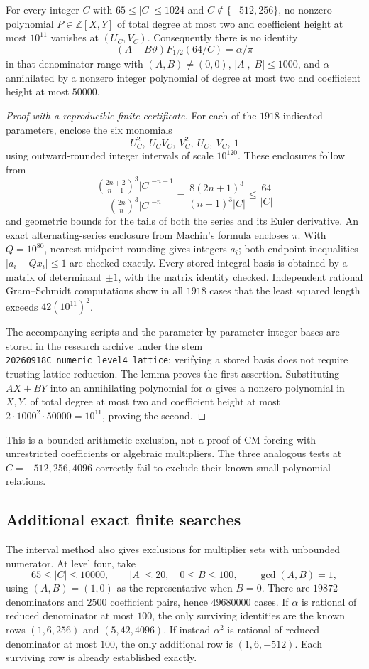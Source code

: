 \begin{proposition}
For every integer $C$ with $65\le|C|\le1024$ and
$C\notin\{-512,256\}$, no nonzero polynomial
$P\in\mathbb Z[X,Y]$ of total degree at most two and coefficient height
at most $10^{11}$ vanishes at $(U_C,V_C)$.
Consequently there is no identity
\[
 (A+B\vartheta)F_{1/2}(64/C)=\alpha/\pi
\]
in that denominator range with $(A,B)\ne(0,0)$,
$|A|,|B|\le1000$, and $\alpha$ annihilated by a nonzero integer
polynomial of degree at most two and coefficient height at most $50000$.
\end{proposition}
\begin{proof}[Proof with a reproducible finite certificate]
For each of the $1918$ indicated parameters, enclose the six monomials
\[
 U_C^2,\ U_CV_C,\ V_C^2,\ U_C,\ V_C,\ 1
\]
using outward-rounded integer intervals of scale $10^{120}$. These
enclosures follow from
\[
 \frac{\binom{2n+2}{n+1}^3|C|^{-n-1}}
      {\binom{2n}{n}^3|C|^{-n}}
 =\frac{8(2n+1)^3}{(n+1)^3|C|}\le\frac{64}{|C|}
\]
and geometric bounds for the tails of both the series and its Euler
derivative. An exact alternating-series enclosure from Machin's formula
encloses $\pi$. With $Q=10^{80}$, nearest-midpoint rounding gives
integers $a_i$; both endpoint inequalities $|a_i-Qx_i|\le1$ are checked
exactly. Every stored integral basis is obtained by a matrix of determinant
$\pm1$, with the matrix identity checked. Independent rational
Gram--Schmidt computations show in all $1918$ cases that the least squared
length exceeds $42(10^{11})^2$.

The accompanying scripts and the parameter-by-parameter integer bases are
stored in the research archive under the stem
\texttt{20260918C\_numeric\_level4\_lattice}; verifying a stored basis
does not require trusting lattice reduction. The lemma proves the first
assertion. Substituting $AX+BY$ into an annihilating polynomial for
$\alpha$ gives a nonzero polynomial in $X,Y$, of total degree at most two
and coefficient height at most
$2\cdot1000^2\cdot50000=10^{11}$, proving the second.
\end{proof}

This is a bounded arithmetic exclusion, not a proof of CM forcing with
unrestricted coefficients or algebraic multipliers. The three analogous
tests at $C=-512,256,4096$ correctly fail to exclude their known small
polynomial relations.

\subsection{Additional exact finite searches}
The interval method also gives exclusions for multiplier sets with
unbounded numerator.  At level four, take
\[
 65\leq |C|\leq10000,\qquad |A|\leq20,\quad 0\leq B\leq100,
 \qquad \gcd(A,B)=1,
\]
using $(A,B)=(1,0)$ as the representative when $B=0$.
There are $19872$ denominators and $2500$ coefficient pairs, hence
$49680000$ cases.  If $\alpha$ is rational of reduced denominator at
most $100$, the only surviving identities are the known rows
$(1,6,256)$ and $(5,42,4096)$.  If instead $\alpha^2$ is rational
of reduced denominator at most $100$, the only additional row is
$(1,6,-512)$.  Each surviving row is already established exactly.

